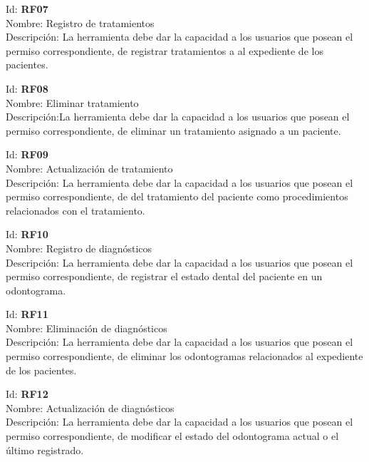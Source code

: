 \vspace{1em}

\noindent Id:  \textbf{RF07}\\
Nombre: Registro de tratamientos\\
Descripción: La herramienta debe dar la capacidad a los usuarios que posean el permiso correspondiente, de registrar tratamientos a al expediente de los pacientes.

\vspace{1em}

\noindent Id:  \textbf{RF08}\\
Nombre: Eliminar tratamiento\\
Descripción:La herramienta debe dar la capacidad a los usuarios que posean el permiso correspondiente, de eliminar un tratamiento asignado a un paciente.

\vspace{1em}

\noindent Id:  \textbf{RF09}\\
Nombre: Actualización de tratamiento\\
Descripción: La herramienta debe dar la capacidad a los usuarios que posean el permiso correspondiente, de del tratamiento del paciente como procedimientos relacionados con el tratamiento.

\vspace{1em}


\noindent Id:  \textbf{RF10}\\
Nombre: Registro de diagnósticos\\
Descripción: La herramienta debe dar la capacidad a los usuarios que posean el permiso correspondiente, de registrar el estado dental del paciente en un odontograma.

\vspace{1em}

\noindent Id:  \textbf{RF11}\\
Nombre: Eliminación de diagnósticos\\
Descripción:  La herramienta debe dar la capacidad a los usuarios que posean el permiso correspondiente, de eliminar los odontogramas relacionados al expediente de los pacientes.

\vspace{1em}

\noindent Id:  \textbf{RF12}\\
Nombre: Actualización de diagnósticos\\
Descripción: La herramienta debe dar la capacidad a los usuarios que posean el permiso correspondiente, de modificar el estado del odontograma actual o el último registrado.

